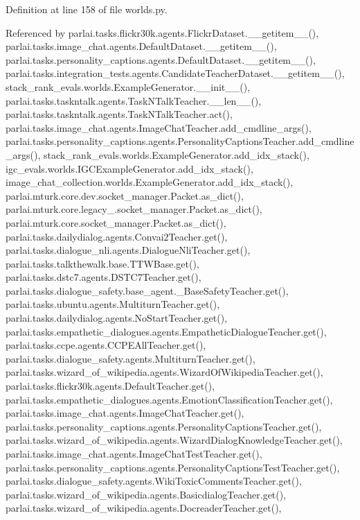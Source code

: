 Definition at line 158 of file worlds.\+py.



Referenced by parlai.\+tasks.\+flickr30k.\+agents.\+Flickr\+Dataset.\+\_\+\+\_\+getitem\+\_\+\+\_\+(), parlai.\+tasks.\+image\+\_\+chat.\+agents.\+Default\+Dataset.\+\_\+\+\_\+getitem\+\_\+\+\_\+(), parlai.\+tasks.\+personality\+\_\+captions.\+agents.\+Default\+Dataset.\+\_\+\+\_\+getitem\+\_\+\+\_\+(), parlai.\+tasks.\+integration\+\_\+tests.\+agents.\+Candidate\+Teacher\+Dataset.\+\_\+\+\_\+getitem\+\_\+\+\_\+(), stack\+\_\+rank\+\_\+evals.\+worlds.\+Example\+Generator.\+\_\+\+\_\+init\+\_\+\+\_\+(), parlai.\+tasks.\+taskntalk.\+agents.\+Task\+N\+Talk\+Teacher.\+\_\+\+\_\+len\+\_\+\+\_\+(), parlai.\+tasks.\+taskntalk.\+agents.\+Task\+N\+Talk\+Teacher.\+act(), parlai.\+tasks.\+image\+\_\+chat.\+agents.\+Image\+Chat\+Teacher.\+add\+\_\+cmdline\+\_\+args(), parlai.\+tasks.\+personality\+\_\+captions.\+agents.\+Personality\+Captions\+Teacher.\+add\+\_\+cmdline\+\_\+args(), stack\+\_\+rank\+\_\+evals.\+worlds.\+Example\+Generator.\+add\+\_\+idx\+\_\+stack(), igc\+\_\+evals.\+worlds.\+I\+G\+C\+Example\+Generator.\+add\+\_\+idx\+\_\+stack(), image\+\_\+chat\+\_\+collection.\+worlds.\+Example\+Generator.\+add\+\_\+idx\+\_\+stack(), parlai.\+mturk.\+core.\+dev.\+socket\+\_\+manager.\+Packet.\+as\+\_\+dict(), parlai.\+mturk.\+core.\+legacy\+\_.\+socket\+\_\+manager.\+Packet.\+as\+\_\+dict(), parlai.\+mturk.\+core.\+socket\+\_\+manager.\+Packet.\+as\+\_\+dict(), parlai.\+tasks.\+dailydialog.\+agents.\+Convai2\+Teacher.\+get(), parlai.\+tasks.\+dialogue\+\_\+nli.\+agents.\+Dialogue\+Nli\+Teacher.\+get(), parlai.\+tasks.\+talkthewalk.\+base.\+T\+T\+W\+Base.\+get(), parlai.\+tasks.\+dstc7.\+agents.\+D\+S\+T\+C7\+Teacher.\+get(), parlai.\+tasks.\+dialogue\+\_\+safety.\+base\+\_\+agent.\+\_\+\+Base\+Safety\+Teacher.\+get(), parlai.\+tasks.\+ubuntu.\+agents.\+Multiturn\+Teacher.\+get(), parlai.\+tasks.\+dailydialog.\+agents.\+No\+Start\+Teacher.\+get(), parlai.\+tasks.\+empathetic\+\_\+dialogues.\+agents.\+Empathetic\+Dialogue\+Teacher.\+get(), parlai.\+tasks.\+ccpe.\+agents.\+C\+C\+P\+E\+All\+Teacher.\+get(), parlai.\+tasks.\+dialogue\+\_\+safety.\+agents.\+Multiturn\+Teacher.\+get(), parlai.\+tasks.\+wizard\+\_\+of\+\_\+wikipedia.\+agents.\+Wizard\+Of\+Wikipedia\+Teacher.\+get(), parlai.\+tasks.\+flickr30k.\+agents.\+Default\+Teacher.\+get(), parlai.\+tasks.\+empathetic\+\_\+dialogues.\+agents.\+Emotion\+Classification\+Teacher.\+get(), parlai.\+tasks.\+image\+\_\+chat.\+agents.\+Image\+Chat\+Teacher.\+get(), parlai.\+tasks.\+personality\+\_\+captions.\+agents.\+Personality\+Captions\+Teacher.\+get(), parlai.\+tasks.\+wizard\+\_\+of\+\_\+wikipedia.\+agents.\+Wizard\+Dialog\+Knowledge\+Teacher.\+get(), parlai.\+tasks.\+image\+\_\+chat.\+agents.\+Image\+Chat\+Test\+Teacher.\+get(), parlai.\+tasks.\+personality\+\_\+captions.\+agents.\+Personality\+Captions\+Test\+Teacher.\+get(), parlai.\+tasks.\+dialogue\+\_\+safety.\+agents.\+Wiki\+Toxic\+Comments\+Teacher.\+get(), parlai.\+tasks.\+wizard\+\_\+of\+\_\+wikipedia.\+agents.\+Basicdialog\+Teacher.\+get(), parlai.\+tasks.\+wizard\+\_\+of\+\_\+wikipedia.\+agents.\+Docreader\+Teacher.\+get(), 